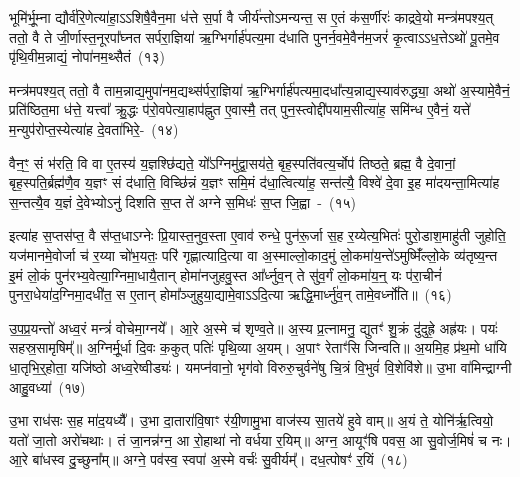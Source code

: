 भूमि॑र्भू॒म्ना द्यौर्व॑रि॒णेत्या॑हा॒\-ऽऽ\-शिषै॒वैन॒मा ध॑त्ते स॒र्पा वै जीर्य॑न्तो\-ऽमन्यन्त॒ स ए॒तं क॑स॒र्णीरः॑ काद्रवे॒यो मन्त्र॑मपश्य॒त् ततो॒ वै ते जी॒र्णास्त॒नूरपा᳚घ्नत सर्परा॒ज्ञिया॑ ऋ॒ग्भिर्गार्\mbox{}ह॑पत्य॒मा द॑धाति पुनर्न॒वमे॒वैन॑म॒जरं॑ कृ॒त्वा\-ऽऽ\-ध॒त्ते\-ऽथो॑ पू॒तमे॒व पृ॑थि॒वीम॒न्नाद्यं॒ नोपा॑नम॒थ्सैतं~(१३)

मन्त्र॑मपश्य॒त् ततो॒ वै ताम॒न्नाद्य॒मुपा॑\-नम॒द्यथ्स॑र्परा॒ज्ञिया॑ ऋ॒ग्भिर्गार्\mbox{}ह॑पत्यमा॒दधा᳚त्य॒न्ना\-द्य॒स्या\-व॑रुद्ध्या॒ अथो॑ अ॒स्यामे॒वैनं॒ प्रति॑ष्ठित॒मा ध॑त्ते॒ यत्त्वा᳚ क्रु॒द्धः प॑रो॒वपेत्या॒हाप॑ह्नुत ए॒वास्मै॒ तत् पुन॒स्त्वोद्दी॑पयाम॒सीत्या॑ह॒ समि॑न्ध ए॒वैनं॒ यत्ते॑ म॒न्युप॑रोप्त॒स्येत्या॑ह दे॒वता॑भिरे॒-~(१४)

वैन॒ꣳ॒ सं भ॑रति॒ वि वा ए॒तस्य॑ य॒ज्ञश्छि॑द्यते॒ यो᳚\-ऽग्निमु॑द्वा॒सय॑ते॒ बृह॒स्पति॑वत्य॒र्चोप॑ तिष्ठते॒ ब्रह्म॒ वै दे॒वानां॒ बृह॒स्पति॒र्ब्रह्म॑णै॒व य॒ज्ञꣳ सं द॑धाति॒ विच्छि॑न्नं य॒ज्ञꣳ समि॒मं द॑धा॒त्वित्या॑ह॒ सन्त॑त्यै॒ विश्वे॑ दे॒वा इ॒ह मा॑दयन्ता॒मित्या॑ह स॒न्तत्यै॒व य॒ज्ञं दे॒वेभ्यो\-ऽनु॑ दिशति स॒प्त ते॑ अग्ने स॒मिधः॑ स॒प्त जि॒ह्वा~-~(१५)

इत्या॑ह स॒प्तस॑प्त॒ वै स॑प्त॒धा\-ऽग्नेः प्रि॒यास्त॒नुव॒स्ता ए॒वाव॑ रुन्धे॒ पुन॑रू॒र्जा स॒ह र॒य्येत्य॒भितः॑ पुरो॒डाश॒माहु॑ती जुहोति॒ यज॑मानमे॒वोर्जा च॑ र॒य्या चो॑भ॒यतः॒ परि॑ गृह्णात्यादि॒त्या वा अ॒स्माल्लो॒काद॒मुं लो॒कमा॑य॒न्ते॑\-ऽमुष्मिँ॑ल्लो॒के व्य॑तृष्य॒न्त इ॒मं लो॒कं पुन॑रभ्य॒\-वेत्या॒ग्नि\-मा॒धायै॒तान् होमा॑नजुहवु॒स्त आ᳚र्ध्नुव॒न् ते सु॑व॒र्गं लो॒कमा॑य॒न्॒ यः प॑रा॒चीनं॑ पुनरा॒धेया॑द॒ग्निमा॒दधी॑त॒ स ए॒तान् होमा᳚ञ्जुहुया॒द्यामे॒वा\-ऽऽ\-दि॒त्या ऋद्धि॒मार्ध्नु॑व॒न् तामे॒वर्ध्नो॑ति॥~(१६)

{\anuvakamend[{ए॒तमे॒व जि॒ह्वा ए॒तान् पञ्च॑विꣳशतिश्च}]}%

उ॒प॒प्र॒यन्तो॑ अध्व॒रं मन्त्रं॑ वोचेमा॒ग्नये᳚। आ॒रे अ॒स्मे च॑ शृण्व॒ते॥ अ॒स्य प्र॒त्नामनु॒ द्युतꣳ॑ शु॒क्रं दु॑दुह्रे॒ अह्र॑यः। पयः॑ सहस्र॒सामृषिम्᳚॥ अ॒ग्निर्मू॒र्धा दि॒वः क॒कुत् पतिः॑ पृथि॒व्या अ॒यम्। अ॒पाꣳ रेताꣳ॑सि जिन्वति॥ अ॒यमि॒ह प्र॑थ॒मो धा॑यि धा॒तृभि॒र्॒\mbox{}होता॒ यजि॑ष्ठो अध्व॒रेष्वीड्यः॑। यमप्न॑वानो॒ भृग॑वो विरुरु॒चुर्वने॑षु चि॒त्रं वि॒भुवं॑ वि॒शेवि॑शे॥ उ॒भा वा॑मिन्द्राग्नी आहु॒वध्या॑~(१७)

उ॒भा राध॑सः स॒ह मा॑द॒यध्यै᳚। उ॒भा दा॒तारा॑वि॒षाꣳ र॑यी॒णामु॒भा वाज॑स्य सा॒तये॑ हुवे वाम्॥ अ॒यं ते॒ योनि॑र्\mbox{}ऋ॒त्वियो॒ यतो॑ जा॒तो अरो॑चथाः। तं जा॒नन्न॑ग्न॒ आ रो॒हाथा॑ नो वर्धया र॒यिम्॥ अग्न॒ आयूꣳ॑षि पवस॒ आ सु॒वोर्ज॒मिषं॑ च नः। आ॒रे बा॑धस्व दु॒च्छुना᳚म्॥ अग्ने॒ पव॑स्व॒ स्वपा॑ अ॒स्मे वर्चः॑ सु॒वीर्यम्᳚। दध॒त्पोषꣳ॑ र॒यिं~(१८)


